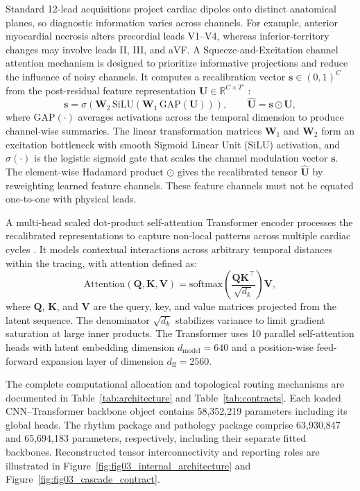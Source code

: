 \documentclass[life,article,submit,moreauthors]{Definitions/mdpi}
\begin{document}
Standard 12-lead acquisitions project cardiac dipoles onto distinct anatomical planes, so diagnostic information varies across channels. For example, anterior myocardial necrosis alters precordial leads V1--V4, whereas inferior-territory changes may involve leads II, III, and aVF. A Squeeze-and-Excitation channel attention mechanism is designed to prioritize informative projections and reduce the influence of noisy channels. It computes a recalibration vector $\mathbf{s} \in (0,1)^C$ from the post-residual feature representation $\mathbf{U} \in \mathbb{R}^{C \times T'}$ \citep{Hu2018Squeeze}:
\begin{equation}
\mathbf{s}=\sigma\!\left(\mathbf{W}_2\,\mathrm{SiLU}(\mathbf{W}_1\,\mathrm{GAP}(\mathbf{U}))\right),\qquad \widehat{\mathbf{U}}=\mathbf{s}\odot\mathbf{U},
\end{equation}
where $\mathrm{GAP}(\cdot)$ averages activations across the temporal dimension to produce channel-wise summaries. The linear transformation matrices $\mathbf{W}_1$ and $\mathbf{W}_2$ form an excitation bottleneck with smooth Sigmoid Linear Unit ($\mathrm{SiLU}$) activation, and $\sigma(\cdot)$ is the logistic sigmoid gate that scales the channel modulation vector $\mathbf{s}$. The element-wise Hadamard product $\odot$ gives the recalibrated tensor $\widehat{\mathbf{U}}$ by reweighting learned feature channels. These feature channels must not be equated one-to-one with physical leads.

A multi-head scaled dot-product self-attention Transformer encoder processes the recalibrated representations to capture non-local patterns across multiple cardiac cycles \citep{Vaswani2017Attention}. It models contextual interactions across arbitrary temporal distances within the tracing, with attention defined as:
\begin{equation}
\mathrm{Attention}(\mathbf{Q},\mathbf{K},\mathbf{V})=\mathrm{softmax}\!\left(\frac{\mathbf{Q}\mathbf{K}^{\top}}{\sqrt{d_k}}\right)\mathbf{V},
\end{equation}
where $\mathbf{Q}$, $\mathbf{K}$, and $\mathbf{V}$ are the query, key, and value matrices projected from the latent sequence. The denominator $\sqrt{d_k}$ stabilizes variance to limit gradient saturation at large inner products. The Transformer uses 10 parallel self-attention heads with latent embedding dimension $d_{\mathrm{model}}=640$ and a position-wise feed-forward expansion layer of dimension $d_{\mathrm{ff}}=2560$.

The complete computational allocation and topological routing mechanisms are documented in Table~\ref{tab:architecture} and Table~\ref{tab:contracts}. Each loaded CNN--Transformer backbone object contains 58,352,219 parameters including its global heads. The rhythm package and pathology package comprise 63,930,847 and 65,694,183 parameters, respectively, including their separate fitted backbones. Reconstructed tensor interconnectivity and reporting roles are illustrated in Figure~\ref{fig:fig03_internal_architecture} and Figure~\ref{fig:fig03_cascade_contract}.
\end{document}
